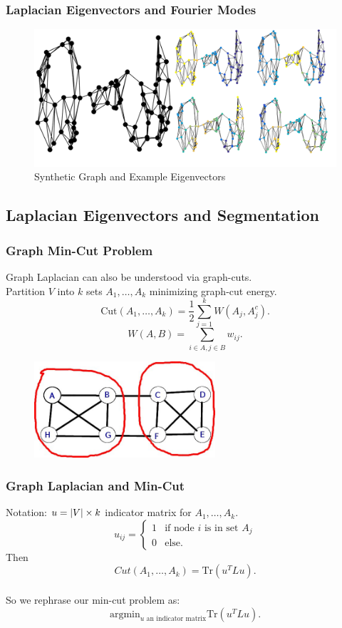 \documentclass{beamer}
\begin{document}

\begin{frame}
  \frametitle{Laplacian Eigenvectors and Fourier Modes}
  \begin{figure}
    \centering
    \includegraphics[width=\textwidth]{./Images/SyntheticGraph/combinedPic.png}
    \caption{Synthetic Graph and Example Eigenvectors}
  \end{figure}
\end{frame}

\subsection{Laplacian Eigenvectors and Segmentation}
\begin{frame}
  \frametitle{Graph Min-Cut Problem}
  Graph Laplacian can also be understood via graph-cuts.\\
  Partition $V$ into $k$ sets $A_1,\ldots,A_k$ minimizing graph-cut energy.
  \[\text{Cut}(A_1,\ldots,A_k) = \frac{1}{2}\sum_{j=1}^kW(A_j,A_j^c).\]
  \[W(A,B) = \sum_{i \in A, j \in B} w_{ij}.\]
  \begin{figure}
    \centering
    \includegraphics[width=0.6\textwidth]{./Images/graphMinCut.jpg}
  \end{figure}
\end{frame}

\begin{frame}
  \frametitle{Graph Laplacian and Min-Cut}
  Notation: $u = \left\lvert V\right\rvert\times k$ indicator matrix for $A_1,\ldots,A_k$.
  \[u_{ij} = \begin{cases} 1 &\text{if node $i$ is in set $A_j$} \\
      0 & \text{else}.
    \end{cases}\]
  Then \[Cut(A_1,\ldots,A_k) = \text{Tr}\left(u^TLu\right).\] \\
  So we rephrase our min-cut problem as:
  \[\text{argmin}_{u\text{ an indicator matrix}}\text{Tr}\left(u^TLu\right).\]
\end{frame}
\end{document}
